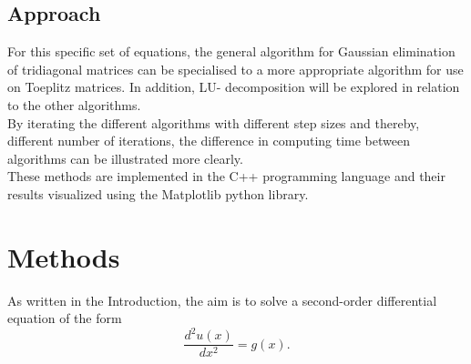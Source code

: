\documentclass[10pt,a4paper]{article}
\begin{document}
\subsection{Approach}
For this specific set of equations, the general algorithm for Gaussian elimination of tridiagonal matrices can be specialised to a more appropriate algorithm for use on Toeplitz matrices. In addition, LU- decomposition will be explored in relation to the other algorithms.\\ By iterating the different algorithms with different step sizes and thereby, different number of iterations, the difference in computing time between algorithms can be illustrated more clearly. \\These methods are implemented in the C++ programming language and their results visualized using the Matplotlib python library.
\section{Methods}

As written in the Introduction, the aim is to solve a second-order differential equation of the form
$$\frac{d^2u(x)}{dx^2} = g(x).$$
\end{document}

